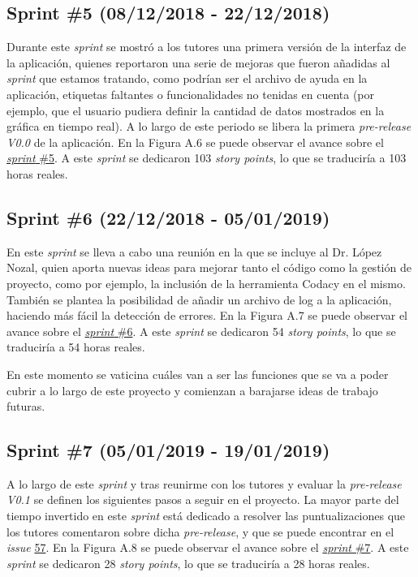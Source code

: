 \subsection{Sprint \#5 (08/12/2018 - 22/12/2018)}

Durante este \textit{sprint} se mostró a los tutores una primera versión de la interfaz de la aplicación, quienes reportaron una serie de mejoras que fueron añadidas al \textit{sprint} que estamos tratando, como podrían ser el archivo de ayuda en la aplicación, etiquetas faltantes o funcionalidades no tenidas en cuenta (por ejemplo, que el usuario pudiera definir la cantidad de datos mostrados en la gráfica en tiempo real). A lo largo de este periodo se libera la primera \textit{pre-release V0.0} de la aplicación. En la Figura A.6 se puede observar el avance sobre el \href{https://github.com/FranBurgos/TFG/milestone/6?closed=1}{\textit{sprint} \#5}. A este \textit{sprint} se dedicaron 103 \textit{story points}, lo que se traduciría a 103 horas reales.


\subsection{Sprint \#6 (22/12/2018 - 05/01/2019)}

En este \textit{sprint} se lleva a cabo una reunión en la que se incluye al Dr. López Nozal, quien aporta nuevas ideas para mejorar tanto el código como la gestión de proyecto, como por ejemplo, la inclusión de la herramienta Codacy en el mismo. También se plantea la posibilidad de añadir un archivo de log a la aplicación, haciendo más fácil la detección de errores. En la Figura A.7 se puede observar el avance sobre el \href{https://github.com/FranBurgos/TFG/milestone/7?closed=1}{\textit{sprint} \#6}. A este \textit{sprint} se dedicaron 54 \textit{story points}, lo que se traduciría a 54 horas reales.


En este momento se vaticina cuáles van a ser las funciones que se va a poder cubrir a lo largo de este proyecto y comienzan a barajarse ideas de trabajo futuras. 

\subsection{Sprint \#7 (05/01/2019 - 19/01/2019)}

A lo largo de este \textit{sprint} y tras reunirme con los tutores y evaluar la \textit{pre-release V0.1} se definen los siguientes pasos a seguir en el proyecto. La mayor parte del tiempo invertido en este \textit{sprint} está dedicado a resolver las puntualizaciones que los tutores comentaron sobre dicha \textit{pre-release}, y que se puede encontrar en el \textit{issue} \href{https://github.com/franburgos/tfg/issues/57}{57}. En la Figura A.8 se puede observar el avance sobre el \href{https://github.com/FranBurgos/TFG/milestone/8?closed=1}{\textit{sprint} \#7}. A este \textit{sprint} se dedicaron 28 \textit{story points}, lo que se traduciría a 28 horas reales.


